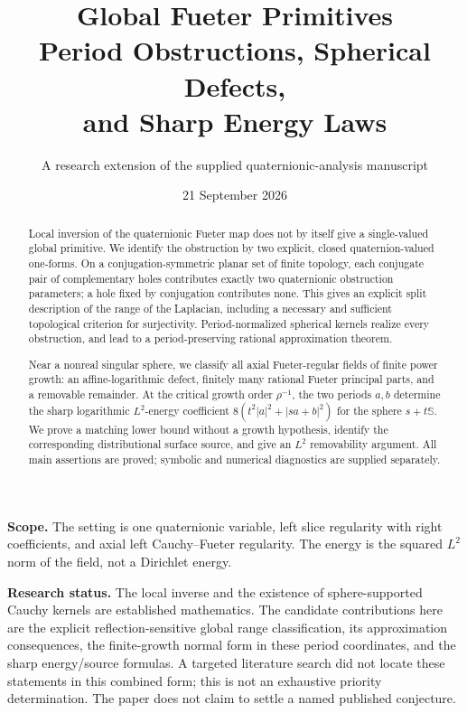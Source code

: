 \documentclass[11pt,a4paper]{article}
\title{\vspace{-10mm}\textbf{Global Fueter Primitives}\\[4pt]
{\Large Period Obstructions, Spherical Defects,\\and Sharp Energy Laws}}
\author{A research extension of the supplied quaternionic-analysis manuscript}
\date{21 September 2026}
\numberwithin{equation}{section}
\theoremstyle{definition}
\theoremstyle{remark}
\newcommand{\SSS}{\mathbb S}
\begin{document}
\maketitle
\thispagestyle{empty}
\begin{abstract}
Local inversion of the quaternionic Fueter map does not by itself give a
single-valued global primitive. We identify the obstruction by two explicit,
closed quaternion-valued one-forms. On a conjugation-symmetric planar set of
finite topology, each conjugate pair of complementary holes contributes
exactly two quaternionic obstruction parameters; a hole fixed by conjugation
contributes none. This gives an explicit split description of the range of
the Laplacian, including a necessary and sufficient topological criterion for
surjectivity. Period-normalized spherical kernels realize every obstruction,
and lead to a period-preserving rational approximation theorem.

Near a nonreal singular sphere, we classify all axial Fueter-regular fields
of finite power growth: an affine-logarithmic defect, finitely many rational
Fueter principal parts, and a removable remainder. At the critical growth
order $\rho^{-1}$, the two periods $a,b$ determine the sharp logarithmic
$L^2$-energy coefficient
$8(t^2|a|^2+|sa+b|^2)$ for the sphere $s+t\SSS$. We prove a matching lower
bound without a growth hypothesis, identify the corresponding distributional
surface source, and give an $L^2$ removability argument. All main assertions
are proved; symbolic and numerical diagnostics are supplied separately.
\end{abstract}
\medskip
\noindent\textbf{Scope.} The setting is one quaternionic variable, left slice
regularity with right coefficients, and axial left Cauchy--Fueter regularity.
The energy is the squared $L^2$ norm of the field, not a Dirichlet energy.

\medskip
\noindent\textbf{Research status.} The local inverse and the existence of
sphere-supported Cauchy kernels are established mathematics. The candidate
contributions here are the explicit reflection-sensitive global range
classification, its approximation consequences, the finite-growth normal
form in these period coordinates, and the sharp energy/source formulas.
A targeted literature search did not locate these statements in this combined
form; this is not an exhaustive priority determination. The paper does not
claim to settle a named published conjecture.
\newpage
\begingroup
\small
\tableofcontents
\endgroup
\newpage
\end{document}
